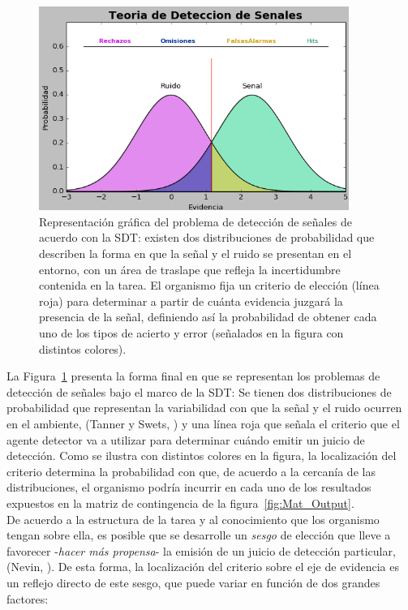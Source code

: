 \begin{figure}[th]
\centering
\includegraphics[width=0.90\textwidth]{Figures/Graficador_Tasas} 
\caption[Representación gráfica de los posibles Resultados en una Tarea de Detección]{Representación gráfica del problema de detección de señales de acuerdo con la SDT: existen dos distribuciones de probabilidad que describen la forma en que la señal y el ruido se presentan en el entorno, con un área de traslape que refleja la incertidumbre contenida en la tarea. El organismo fija un criterio de elección (línea roja) para determinar a partir de cuánta evidencia juzgará la presencia de la señal, definiendo así la probabilidad de obtener cada uno de los tipos de acierto y error (señalados en la figura con distintos colores).}
\label{fig:Graf_Outputs}
\end{figure}

La Figura~\ref{fig:Graf_Outputs} presenta la forma final en que se representan los problemas de detección de señales bajo el marco de la SDT: Se tienen dos distribuciones de probabilidad que representan la variabilidad con que la señal y el ruido ocurren en el ambiente, (Tanner y Swets, \citeyear{Tanner1954}) y una línea roja que señala el criterio que el agente detector va a utilizar para determinar cuándo emitir un juicio de detección. Como se ilustra con distintos colores en la figura, la localización del criterio determina la probabilidad con que, de acuerdo a la cercanía de las distribuciones, el organismo podría incurrir en cada uno de los resultados expuestos en la matriz de contingencia de la figura~\ref{fig:Mat_Output}.\\

De acuerdo a la estructura de la tarea y al conocimiento que los organismo tengan sobre ella, es posible que se desarrolle un \textit{sesgo} de elección que lleve a favorecer -\textit{hacer más propensa}- la emisión de un juicio de detección particular, (Nevin, \citeyear{Nevin1969}). De esta forma, la localización del criterio sobre el eje de evidencia es un reflejo directo de este sesgo, que puede variar en función de dos grandes factores:\\

